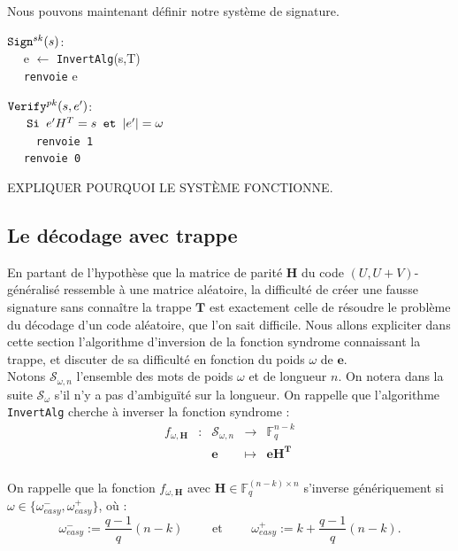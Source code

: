 \documentclass[12pt]{article}
\theoremstyle{plain}
\newcommand{\F}{\mathbb{F}}
\newcommand{\e}{\mathbf{e}}
\begin{document}
\noindent Nous pouvons maintenant définir notre système de signature.
\begin{multicols}{2}
\begin{flushleft}
$\verb|Sign|^{sk}(s)$:\\
	$\quad$ e $\leftarrow$  \verb|InvertAlg|(s,T) \\
	$\quad$ \verb|renvoie| e
\end{flushleft}
\begin{flushleft}
$\verb|Verify|^{pk}(s,e')$: \\
	$\quad \verb| Si | e'H^T = s \verb| et | |e'| = \omega $ \\
	$\quad \quad$ \verb|renvoie 1| \\
	$\quad$ \verb|renvoie 0|
\end{flushleft}
\end{multicols}

EXPLIQUER POURQUOI LE SYSTÈME FONCTIONNE.

\subsection{Le décodage avec trappe}

En partant de l'hypothèse que la matrice de parité $\mathbf{H}$ du code $(U,U+V)$-généralisé ressemble à une matrice aléatoire, la difficulté de créer une fausse signature sans connaître la trappe $\mathbf{T}$ est exactement celle de résoudre le problème du décodage d'un code aléatoire, que l'on sait difficile. Nous allons expliciter dans cette section l'algorithme d'inversion de la fonction syndrome connaissant la trappe, et discuter de sa difficulté en fonction du poids $\omega$ de $\e$. \\

\noindent Notons $\mathcal{S}_{\omega,n}$ l'ensemble des mots de poids $\omega$ et de longueur $n$. On notera dans la suite $\mathcal{S}_{\omega}$ s'il n'y a pas d’ambiguïté sur la longueur. On rappelle que l'algorithme \verb|InvertAlg| cherche à inverser la fonction syndrome : 
$$\begin{array}{ccccc}
f_{\omega,\mathbf{H}} & : & \mathcal{S}_{\omega,n} & \to & \F_q^{n-k} \\
 & & \mathbf{e} & \mapsto & \mathbf{eH^T} \\
\end{array}$$

\noindent On rappelle que la fonction $f_{\omega,\mathbf{H}}$ avec $\mathbf{H} \in \F_q^{(n-k)\times n}$ s'inverse génériquement si $\omega \in \{\omega_{easy}^-,\omega_{easy}^+\}$, où :
$$ \omega_{easy}^- := \frac{q-1}{q}(n-k) \qquad \text{ et }\qquad  \omega_{easy}^+ := k + \frac{q-1}{q}(n-k).$$
\end{document}
